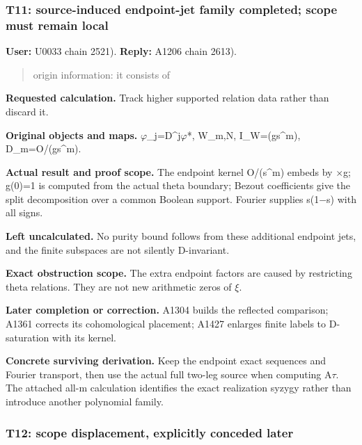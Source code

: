 \subsubsection{T11: source-induced endpoint-jet family completed; scope
must remain
local}\label{TranscriptLedgerStage:t11-source-induced-endpoint-jet-family-completed-scope-must-remain-local}

\textbf{User:} U0033
\protect{} chain 2521).
\textbf{Reply:} A1206
\protect{} chain 2613).

\begin{quote}
origin information: it consists of
\end{quote}

\textbf{Requested calculation.} Track higher supported relation data
rather than discard it.

\textbf{Original objects and maps.}
\allowbreak{}\ensuremath{φ}\allowbreak{}\_j=D\textasciicircum{}j\allowbreak{}\ensuremath{φ}\allowbreak{}*,
W\_m,N, I\_W=(gs\^{}m), D\_m=O/(gs\^{}m).

\textbf{Actual result and proof scope.} The endpoint kernel O/(s\^{}m)
embeds by \allowbreak{}\ensuremath{×}\allowbreak{}g; g(0)=1 is computed
from the actual theta boundary; Bezout coefficients give the split
decomposition over a common Boolean support. Fourier supplies
s(1\allowbreak{}\ensuremath{−}\allowbreak{}s) with all signs.

\textbf{Left uncalculated.} No purity bound follows from these
additional endpoint jets, and the finite subspaces are not silently
D-invariant.

\textbf{Exact obstruction scope.} The extra endpoint factors are caused
by restricting theta relations. They are not new arithmetic zeros of
\allowbreak{}\ensuremath{ξ}\allowbreak{}.

\textbf{Later completion or correction.} A1304 builds the reflected
comparison; A1361 corrects its cohomological placement; A1427 enlarges
finite labels to D-saturation with its kernel.

\textbf{Concrete surviving derivation.} Keep the endpoint exact
sequences and Fourier transport, then use the actual full two-leg source
when computing A\allowbreak{}\ensuremath{τ}\allowbreak{}. The attached
all-m calculation identifies the exact realization syzygy rather than
introduce another polynomial family.

\subsubsection{T12: scope displacement, explicitly conceded
later}\label{TranscriptLedgerStage:t12-scope-displacement-explicitly-conceded-later}

